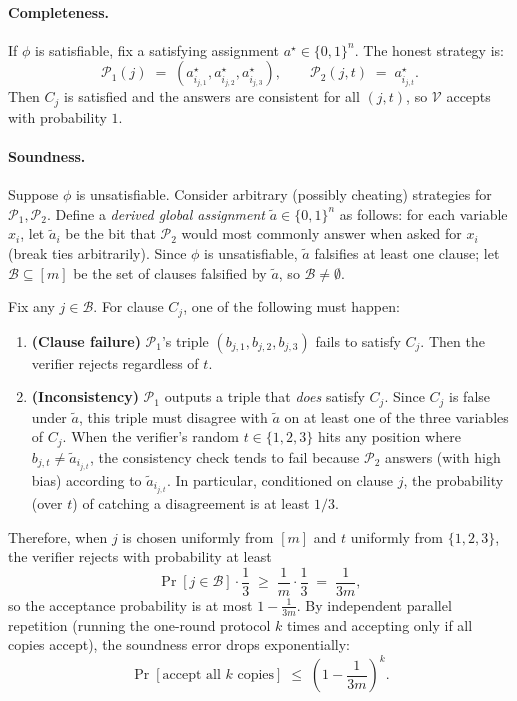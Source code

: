 \paragraph{Completeness.}
If $\phi$ is satisfiable, fix a satisfying assignment $a^\star\in\{0,1\}^n$. The honest strategy is:
\[
\mathcal{P}_1(j)\;=\;(a^\star_{i_{j,1}},a^\star_{i_{j,2}},a^\star_{i_{j,3}}),\qquad
\mathcal{P}_2(j,t)\;=\;a^\star_{i_{j,t}}.
\]
Then $C_j$ is satisfied and the answers are consistent for all $(j,t)$, so $\mathcal{V}$ accepts with probability $1$.

\paragraph{Soundness.}
Suppose $\phi$ is unsatisfiable. Consider arbitrary (possibly cheating) strategies for $\mathcal{P}_1,\mathcal{P}_2$. Define a \emph{derived global assignment} $\tilde{a}\in\{0,1\}^n$ as follows: for each variable $x_i$, let $\tilde{a}_i$ be the bit that $\mathcal{P}_2$ would most commonly answer when asked for $x_i$ (break ties arbitrarily). Since $\phi$ is unsatisfiable, $\tilde{a}$ falsifies at least one clause; let $\mathcal{B}\subseteq [m]$ be the set of clauses falsified by $\tilde{a}$, so $\mathcal{B}\neq\emptyset$.

Fix any $j\in\mathcal{B}$. For clause $C_j$, one of the following must happen:
\begin{enumerate}
  \item \textbf{(Clause failure)} $\mathcal{P}_1$'s triple $(b_{j,1},b_{j,2},b_{j,3})$ fails to satisfy $C_j$. Then the verifier rejects regardless of $t$.
  \item \textbf{(Inconsistency)} $\mathcal{P}_1$ outputs a triple that \emph{does} satisfy $C_j$. Since $C_j$ is false under $\tilde{a}$, this triple must disagree with $\tilde{a}$ on at least one of the three variables of $C_j$. When the verifier’s random $t\in\{1,2,3\}$ hits any position where $b_{j,t}\neq \tilde{a}_{i_{j,t}}$, the consistency check tends to fail because $\mathcal{P}_2$ answers (with high bias) according to $\tilde{a}_{i_{j,t}}$. In particular, conditioned on clause $j$, the probability (over $t$) of catching a disagreement is at least $1/3$.
\end{enumerate}
Therefore, when $j$ is chosen uniformly from $[m]$ and $t$ uniformly from $\{1,2,3\}$, the verifier rejects with probability at least
\[
\Pr[j\in\mathcal{B}]\cdot \frac{1}{3} \;\ge\; \frac{1}{m}\cdot \frac{1}{3}\;=\;\frac{1}{3m},
\]
so the acceptance probability is at most $1-\frac{1}{3m}$. By independent parallel repetition (running the one-round protocol $k$ times and accepting only if all copies accept), the soundness error drops exponentially:
\[
\Pr[\text{accept all }k\text{ copies}] \;\le\; \left(1-\frac{1}{3m}\right)^k.
\]

